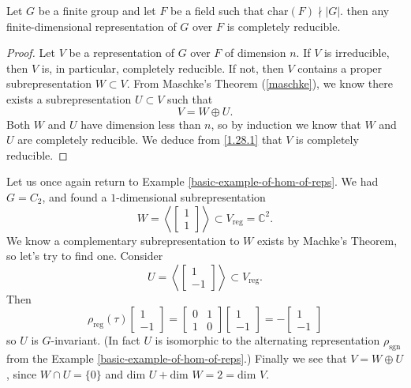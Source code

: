 \begin{cor}
Let $G$ be a finite group and let $F$ be a field such that $\text{char}(F) \nmid |G|$. then any finite-dimensional representation of $G$ over $F$ is completely reducible.
\end{cor}
\begin{proof}
Let $V$ be a representation of $G$ over $F$ of dimension $n$.  If $V$ is irreducible, then $V$ is, in particular, completely reducible.  If not, then $V$ contains a proper subrepresentation $W \subset V$.  From Maschke's Theorem (\ref{maschke}), we know there exists a subrepresentation $U \subset V$ such that 
\begin{equation} \label{1.28.1} V = W \oplus U. \end{equation}
Both $W$ and $U$ have dimension less than $n$, so by induction we know that $W$ and $U$ are completely reducible. We deduce from \ref{1.28.1} that $V$ is completely reducible.
\end{proof}

\begin{example}
Let us once again return to Example \ref{basic-example-of-hom-of-reps}.  We had $G= C_2$, and found a $1$-dimensional subrepresentation 
\[ W = \left< \begin{bmatrix}1 \\ 1 \end{bmatrix} \right> \subset V_{\text{reg}}= \mathbb{C}^2 . \]
We know a complementary subrepresentation to $W$ exists by Machke's Theorem, so let's try to find one.  Consider
\[ U =  \left< \begin{bmatrix}1 \\ -1 \end{bmatrix} \right> \subset V_{\text{reg}}. \]
Then
\[ \rho_{\text{reg}}(\tau) \begin{bmatrix}1 \\ -1 \end{bmatrix} =  \begin{bmatrix} 0 & 1 \\ 1 & 0 \end{bmatrix} \begin{bmatrix}1 \\ -1 \end{bmatrix} = -  \begin{bmatrix}1 \\ -1 \end{bmatrix} \]
so $U$ is $G$-invariant.  (In fact $U$ is isomorphic to the alternating representation $\rho_{\text{sgn}}$ from the Example \ref{basic-example-of-hom-of-reps}.)  Finally we see that $V = W \oplus U$, since $W \cap U = \{ 0 \}$ and $\text{dim } U + \text{dim } W = 2 = \text{dim } V$.
\end{example}





